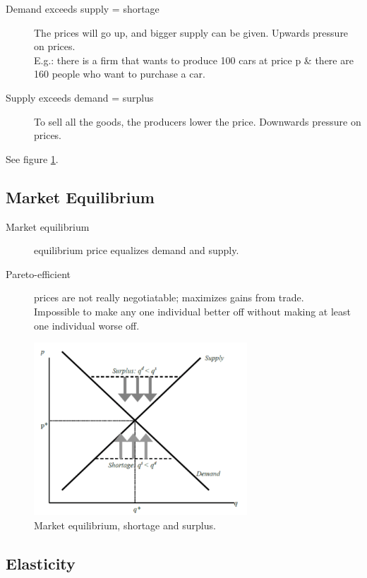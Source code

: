 \documentclass[12pt, a4paper, titlepage]{extarticle}
\begin{document}
	\begin{description}
		\item[Demand exceeds supply = shortage] The prices will go up, and bigger supply can be given. Upwards pressure on prices.\\
		E.g.: there is a firm that wants to produce 100 cars at price p \& there are 160 people who want to purchase a car.
		\item[Supply exceeds demand = surplus] To sell all the goods, the producers lower the price. Downwards pressure on prices.
	\end{description}
	See figure \ref{imgEquilibriumShortageSurplus}.
	
	\subsection{Market Equilibrium}
	
	\begin{description}
		\item[Market equilibrium] equilibrium price equalizes demand and supply.
		\item[Pareto-efficient] prices are not really negotiatable; maximizes gains from trade.\\
		Impossible to make any one individual better off without making at least one individual worse off.
	\end{description}
	
	\begin{figure}[h]
	\centering
		\includegraphics[width=8cm]{EquilibriumShortageSurplus}
		\caption{Market equilibrium, shortage and surplus. \label{imgEquilibriumShortageSurplus}}	
	\end{figure}
	
	\subsection{Elasticity}
	
\end{document}
